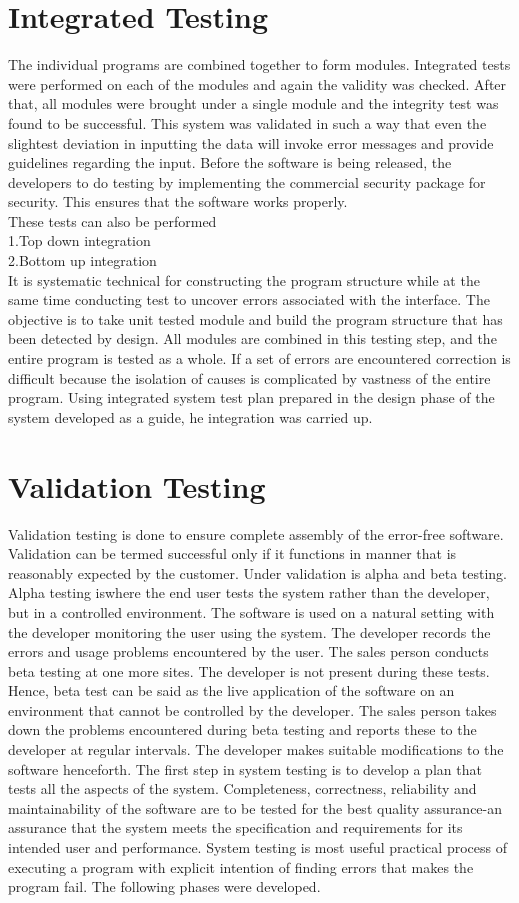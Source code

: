 \section{ Integrated Testing}
The individual programs are combined together to form modules. Integrated tests were performed on each of the modules and again the validity was checked. After that, all modules were brought under a single module and the integrity test was found to be successful. This system was validated in such a way that even the slightest deviation in inputting the data will invoke error messages and provide guidelines regarding the input. Before the software is being released, the developers to do testing by implementing the commercial security package for security. This ensures that the software works properly.\\
These tests can also be performed\\
1.Top down integration\\
2.Bottom up integration\\
It is systematic technical for constructing the program structure while at the same time conducting test to uncover errors associated with the interface. The objective is to take unit tested module and build the program structure that has been detected by design. All modules are combined in this testing step, and the entire program is tested as a whole. If a set of errors are encountered correction is difficult because the isolation of causes is complicated by vastness of the entire program. Using integrated system test plan prepared in the design phase of the system developed as a guide, he integration was carried up.\\
\section{ Validation Testing}
Validation testing is done to ensure complete assembly of the error-free software. Validation can be termed successful only if it functions in manner that is reasonably expected by the customer. Under validation is alpha and beta testing. Alpha testing iswhere the end user tests the system rather than the developer, but in a controlled environment. The software is used on a natural setting with the developer monitoring the user using the system. The developer records the errors and usage problems encountered by the user. The sales person conducts beta testing at one more sites. The developer is not present during these tests. Hence, beta test can be said as the live application of the software on an environment that cannot be controlled by the developer. The sales person takes down the problems encountered during beta testing and reports these to the developer at regular intervals. The developer makes suitable modifications to the software henceforth. The first step in system testing is to develop a plan that tests all the aspects of the system. Completeness, correctness, reliability and maintainability of the software are to be tested for the best quality assurance-an assurance that the system meets the specification and requirements for its intended user and performance. System testing is most useful practical process of executing a program with explicit intention of finding errors that makes the program fail. The following phases were developed.
